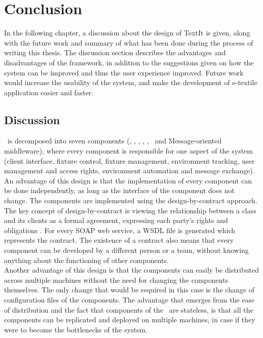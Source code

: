 \chapter{Conclusion}

In the following chapter, a discussion about the design of TextIt is given, along with the future work and summary of what has been done during the process of writing this thesis. The discussion section describes the advantages and disadvantages of the framework, in addition to the suggestions given on how the system can be improved and thus the user experience improved. Future work would increase the usability of the system, and make the development of e-textile application easier and faster. 


\section{Discussion}
\seif\ is decomposed into seven components (\ra, \fc, \fr, \et, \aac, \dm\ and Message-oriented middleware), where every component is responsible for one aspect of the system (client interface, fixture control, fixture management, environment tracking, user management and access rights, environment automation and message exchange). \\ 

	An advantage of this design is that the implementation of every component can be done independently, as long as the interface of the component does not change. The components are implemented using the design-by-contract approach. The key concept of design-by-contract is viewing the relationship between a class and its clients as a formal agreement, expressing each party's rights and obligations \cite{Mayer88}. For every SOAP web service, a WSDL file is generated which represents the contract. The existence of a contract also means that every component can be developed by a different person or a team, without knowing anything about the functioning of other components. \\
Another advantage of this design is that the components can easily be distributed across multiple machines without the need for changing the components themselves. The only change that would be required in this case is the change of configuration files of the components. The advantage that emerges from the ease of distribution and the fact that components of the \seif\ are stateless, is that all the components can be replicated and deployed on multiple machines, in case if they were to become the bottlenecks of the system.\\

